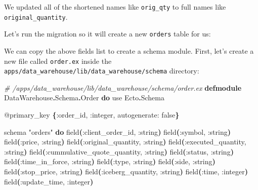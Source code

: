 \documentclass[
  oneside]{book}
\newenvironment{Shaded}{\begin{snugshade}}{\end{snugshade}}
\newcommand{\CommentTok}[1]{\textcolor[rgb]{0.56,0.35,0.01}{\textit{#1}}}
\newcommand{\ConstantTok}[1]{\textcolor[rgb]{0.56,0.35,0.01}{#1}}
\newcommand{\ExtensionTok}[1]{#1}
\newcommand{\FunctionTok}[1]{\textcolor[rgb]{0.13,0.29,0.53}{\textbf{#1}}}
\newcommand{\ImportTok}[1]{#1}
\newcommand{\KeywordTok}[1]{\textcolor[rgb]{0.13,0.29,0.53}{\textbf{#1}}}
\newcommand{\NormalTok}[1]{#1}
\newcommand{\OperatorTok}[1]{\textcolor[rgb]{0.81,0.36,0.00}{\textbf{#1}}}
\newcommand{\OtherTok}[1]{\textcolor[rgb]{0.56,0.35,0.01}{#1}}
\newcommand{\StringTok}[1]{\textcolor[rgb]{0.31,0.60,0.02}{#1}}
\newcommand{\VariableTok}[1]{\textcolor[rgb]{0.00,0.00,0.00}{#1}}
\begin{document}
We updated all of the shortened names like \texttt{orig\_qty} to full names like \texttt{original\_quantity}.

Let's run the migration so it will create a new \texttt{orders} table for us:

\begin{Shaded}
\end{Shaded}

We can copy the above fields list to create a schema module. First, let's create a new file called \texttt{order.ex} inside the \texttt{apps/data\_warehouse/lib/data\_warehouse/schema} directory:

\begin{Shaded}
\begin{Highlighting}[]
\CommentTok{\# /apps/data\_warehouse/lib/data\_warehouse/schema/order.ex}
\KeywordTok{defmodule} \ConstantTok{DataWarehouse}\OperatorTok{.}\ConstantTok{Schema}\OperatorTok{.}\ConstantTok{Order} \KeywordTok{do}
  \ImportTok{use} \ConstantTok{Ecto}\OperatorTok{.}\ConstantTok{Schema}

  \OtherTok{@primary\_key} \FunctionTok{\{}\VariableTok{:order\_id}\NormalTok{, }\VariableTok{:integer}\NormalTok{, }\VariableTok{autogenerate:} \ConstantTok{false}\FunctionTok{\}}

\NormalTok{  schema }\StringTok{"orders"} \KeywordTok{do}
\NormalTok{    field}\FunctionTok{(}\VariableTok{:client\_order\_id}\NormalTok{, }\VariableTok{:string}\FunctionTok{)}
\NormalTok{    field}\FunctionTok{(}\VariableTok{:symbol}\NormalTok{, }\VariableTok{:string}\FunctionTok{)}
\NormalTok{    field}\FunctionTok{(}\VariableTok{:price}\NormalTok{, }\VariableTok{:string}\FunctionTok{)}
\NormalTok{    field}\FunctionTok{(}\VariableTok{:original\_quantity}\NormalTok{, }\VariableTok{:string}\FunctionTok{)}
\NormalTok{    field}\FunctionTok{(}\VariableTok{:executed\_quantity}\NormalTok{, }\VariableTok{:string}\FunctionTok{)}
\NormalTok{    field}\FunctionTok{(}\VariableTok{:cummulative\_quote\_quantity}\NormalTok{, }\VariableTok{:string}\FunctionTok{)}
\NormalTok{    field}\FunctionTok{(}\VariableTok{:status}\NormalTok{, }\VariableTok{:string}\FunctionTok{)}
\NormalTok{    field}\FunctionTok{(}\VariableTok{:time\_in\_force}\NormalTok{, }\VariableTok{:string}\FunctionTok{)}
\NormalTok{    field}\FunctionTok{(}\VariableTok{:type}\NormalTok{, }\VariableTok{:string}\FunctionTok{)}
\NormalTok{    field}\FunctionTok{(}\VariableTok{:side}\NormalTok{, }\VariableTok{:string}\FunctionTok{)}
\NormalTok{    field}\FunctionTok{(}\VariableTok{:stop\_price}\NormalTok{, }\VariableTok{:string}\FunctionTok{)}
\NormalTok{    field}\FunctionTok{(}\VariableTok{:iceberg\_quantity}\NormalTok{, }\VariableTok{:string}\FunctionTok{)}
\NormalTok{    field}\FunctionTok{(}\VariableTok{:time}\NormalTok{, }\VariableTok{:integer}\FunctionTok{)}
\NormalTok{    field}\FunctionTok{(}\VariableTok{:update\_time}\NormalTok{, }\VariableTok{:integer}\FunctionTok{)}


\end{Highlighting}
\end{Shaded}
\end{document}
